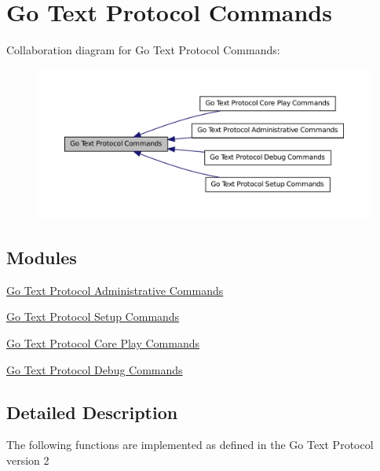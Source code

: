 \hypertarget{group___g_t_p___commands}{
\section{Go Text Protocol Commands}
\label{group___g_t_p___commands}
}


Collaboration diagram for Go Text Protocol Commands:\nopagebreak
\begin{figure}[H]
\begin{center}
\leavevmode
\includegraphics[width=400pt]{group___g_t_p___commands}
\end{center}
\end{figure}


\subsection*{Modules}
\begin{DoxyCompactItemize}
\item 
\hyperlink{group___g_t_p___administrative___commands}{Go Text Protocol Administrative Commands}
\item 
\hyperlink{group___g_t_p___setup___commands}{Go Text Protocol Setup Commands}
\item 
\hyperlink{group___g_t_p___core___play___commands}{Go Text Protocol Core Play Commands}
\item 
\hyperlink{group___g_t_p___debug___commands}{Go Text Protocol Debug Commands}
\end{DoxyCompactItemize}


\subsection{Detailed Description}
The following functions are implemented as defined in the Go Text Protocol version 2 